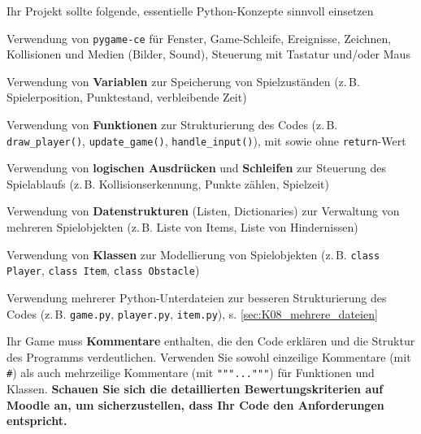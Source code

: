 Ihr Projekt sollte folgende, essentielle Python-Konzepte sinnvoll einsetzen
\begin{todolist}
    \item Verwendung von \texttt{pygame-ce} für Fenster, Game-Schleife, Ereignisse, Zeichnen, Kollisionen und Medien (Bilder, Sound), Steuerung mit Tastatur und/oder Maus
    \item Verwendung von \textbf{Variablen} zur Speicherung von Spielzuständen (z.\,B. Spielerposition, Punktestand, verbleibende Zeit)
    \item {\sloppy Verwendung von \textbf{Funktionen} zur Strukturierung des Codes (z.\,B. \lstinline|draw_player()|, \lstinline|update_game()|, \lstinline|handle_input()|), mit sowie ohne \lstinline|return|-Wert\par}
    \item Verwendung von \textbf{logischen Ausdrücken} und \textbf{Schleifen} zur Steuerung des Spielablaufs (z.\,B. Kollisionserkennung, Punkte zählen, Spielzeit)
    \item Verwendung von \textbf{Datenstrukturen} (Listen, Dictionaries) zur Verwaltung von mehreren Spielobjekten (z.\,B. Liste von Items, Liste von Hindernissen)
    \item Verwendung von \textbf{Klassen} zur Modellierung von Spielobjekten (z.\,B. \lstinline|class Player|, \lstinline|class Item|, \lstinline|class Obstacle|)
    \item Verwendung mehrerer Python-Unterdateien zur besseren Strukturierung des Codes (z.\,B. \lstinline|game.py|, \lstinline|player.py|, \lstinline|item.py|), s. \cref{sec:K08_mehrere_dateien}
\end{todolist}

Ihr Game muss \textbf{Kommentare} enthalten, die den Code erklären und die Struktur des Programms verdeutlichen. Verwenden Sie sowohl einzeilige Kommentare (mit \lstinline|#|) als auch mehrzeilige Kommentare (mit \texttt{"""..."""}) für Funktionen und Klassen. \textbf{Schauen Sie sich die detaillierten Bewertungskriterien auf Moodle an, um sicherzustellen, dass Ihr Code den Anforderungen entspricht.}

